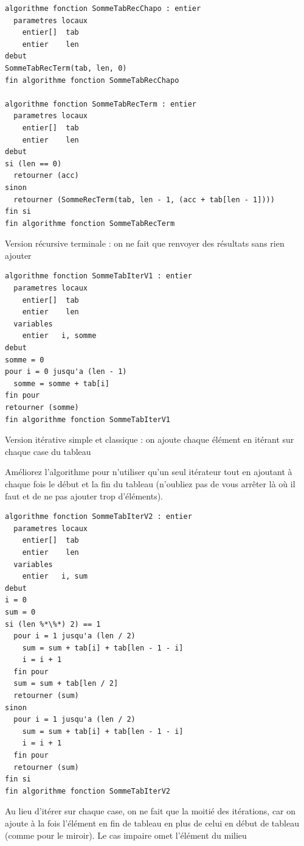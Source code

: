 \documentclass[11pt,a4paper]{article}
\begin{document}
\begin{table}[ht!]
  \centering
\begin{lstlisting}[style=algorithmique]
algorithme fonction SommeTabRecChapo : entier
  parametres locaux
    entier[]  tab
    entier    len
debut
SommeTabRecTerm(tab, len, 0)
fin algorithme fonction SommeTabRecChapo

algorithme fonction SommeTabRecTerm : entier
  parametres locaux
    entier[]  tab
    entier    len
debut
si (len == 0)
  retourner (acc)
sinon
  retourner (SommeRecTerm(tab, len - 1, (acc + tab[len - 1])))
fin si
fin algorithme fonction SommeTabRecTerm \end{lstlisting}
  \caption{Version récursive terminale : on ne fait que renvoyer des résultats sans rien ajouter}
\end{table}

\clearpage

\begin{table}[ht!]
  \centering
\begin{lstlisting}[style=algorithmique]
algorithme fonction SommeTabIterV1 : entier
  parametres locaux
    entier[]  tab
    entier    len
  variables
    entier   i, somme
debut
somme = 0
pour i = 0 jusqu'a (len - 1)
  somme = somme + tab[i]
fin pour
retourner (somme)
fin algorithme fonction SommeTabIterV1 \end{lstlisting}
  \caption{Version itérative simple et classique : on ajoute chaque élément en itérant sur chaque case du tableau}
\end{table}


Améliorez l'algorithme pour n'utiliser qu'un seul itérateur tout en ajoutant à chaque fois le début et la fin du tableau (n'oubliez pas de vous arrêter là où il faut et de ne pas ajouter trop d'éléments).


\begin{table}[ht!]
  \centering
\begin{lstlisting}[style=algorithmique]
algorithme fonction SommeTabIterV2 : entier
  parametres locaux
    entier[]  tab
    entier    len
  variables
    entier   i, sum
debut
i = 0
sum = 0
si (len %*\%*) 2) == 1
  pour i = 1 jusqu'a (len / 2)
    sum = sum + tab[i] + tab[len - 1 - i]
	i = i + 1
  fin pour
  sum = sum + tab[len / 2]
  retourner (sum)
sinon
  pour i = 1 jusqu'a (len / 2)
    sum = sum + tab[i] + tab[len - 1 - i]
	i = i + 1
  fin pour
  retourner (sum)
fin si
fin algorithme fonction SommeTabIterV2 \end{lstlisting}
  \caption{Au lieu d'itérer sur chaque case, on ne fait que la moitié des itérations, car on ajoute à la fois l'élément en fin de tableau en plus de celui en début de tableau (comme pour le miroir). Le cas impaire omet l'élément du milieu}
\end{table}
\end{document}
